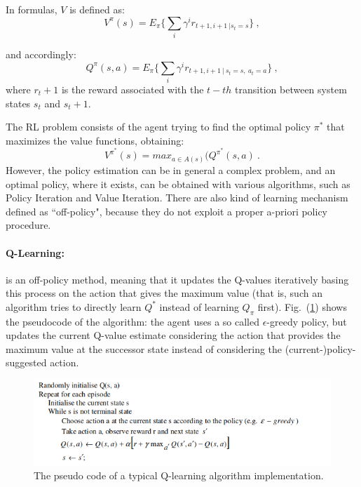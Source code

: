 \documentclass[10pt]{article}
\begin{document}
In formulas, $V$ is defined as:
\begin{equation}
V^\pi(s)=E_\pi \{ \sum_i \gamma^i r_{t+1, i+1 ~ | s_t=s } \}~,
\end{equation}

and accordingly:
\begin{equation}
Q^\pi(s,a)=E_\pi \{ \sum_i \gamma^i r_{t+1, i+1 ~|~ s_t=s,~ a_t=a } \}~,
\end{equation}
where $r_t+1$ is the reward associated with the $t-th$ transition between system states $s_t$ and $s_t+1$.

The RL problem consists of the agent trying to find the optimal policy $\pi^*$ that maximizes the value  functions, obtaining:
\begin{equation}
V^{\pi^*}(s)= max_{a \in A(s)}(Q^{\pi^*}(s,a)~.
\end{equation} 
However, the policy estimation can be in general a complex problem, and an optimal policy, where it exists, can be obtained with various algorithms, such as Policy Iteration and Value Iteration. There are also kind of learning mechanism defined as ``off-policy", because they do not exploit a proper a-priori policy procedure.

\paragraph{Q-Learning:} 
is  an  off-policy  method, meaning  that  it updates the Q-values iteratively basing this process on  the  action that  gives  the  maximum  value  (that is, such an algorithm tries to directly  learn $Q^*$  instead  of  learning $Q_\pi$ first). Fig.~(\ref{fig:q_pseudo}) shows the pseudocode of the algorithm:  the  agent  uses  a  so called $\epsilon$-greedy  policy,  but  updates the  current  Q-value  estimate  considering the  action  that  provides  the  maximum  value  at  the successor state instead of considering the (current-)policy-suggested action. 
\begin{figure}
\centering \includegraphics[scale=0.6]{figs/q_pseudo.png}
\caption{\label{fig:q_pseudo} The pseudo code of a typical Q-learning algorithm implementation.}
\end{figure}
\end{document}
